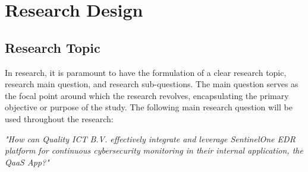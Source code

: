 \chapter{Research Design}

\section{Research Topic}
In research, it is paramount to have the formulation of a clear research topic, research main question,
and research sub-questions. The main question serves as the focal point around which the research revolves,
encapsulating the primary objective or purpose of the study.
The following main research question will be used throughout the research:
\begin{center}
      \textit{"How can Quality ICT B.V. effectively integrate and leverage SentinelOne EDR platform
            for continuous cybersecurity monitoring in their internal application, the QaaS App?"}
\end{center}
